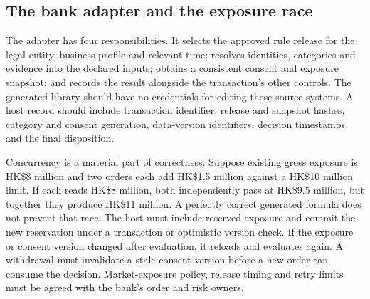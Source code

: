 \subsection{The bank adapter and the exposure race}
\label{merge:P-03d-java-delivery:05}


The adapter has four responsibilities. It selects the approved rule release for
the legal entity, business profile and relevant time; resolves identities,
categories and evidence into the declared inputs; obtains a consistent consent
and exposure snapshot; and records the result alongside the transaction's other
controls. The generated library should have no credentials for editing these
source systems. A host record should include transaction identifier, release and
snapshot hashes, category and consent generation, data-version identifiers,
decision timestamps and the final disposition.

Concurrency is a material part of correctness. Suppose existing gross exposure
is HK\$8 million and two orders each add HK\$1.5 million against a HK\$10 million
limit. If each reads HK\$8 million, both independently pass at HK\$9.5 million,
but together they produce HK\$11 million. A perfectly correct generated formula
does not prevent that race. The host must include reserved exposure and commit
the new reservation under a transaction or optimistic version check. If the
exposure or consent version changed after evaluation, it reloads and evaluates
again. A withdrawal must invalidate a stale consent version before a new order
can consume the decision. Market-exposure policy, release timing and retry limits
must be agreed with the bank's order and risk owners.

